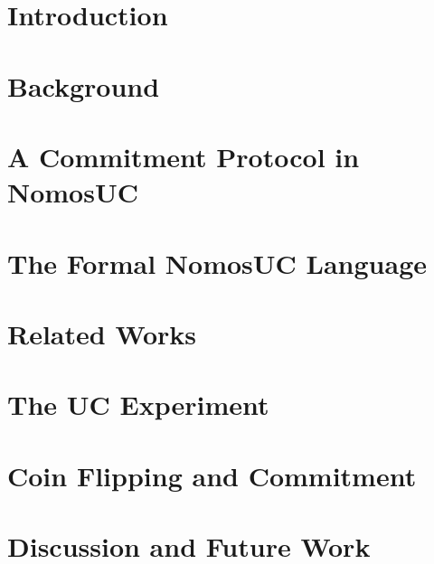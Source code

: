 \documentclass[acmsmall, screen, review, anonymous]{acmart}
\begin{document}
\maketitle



\section{Introduction}


\section{Background} \label{sec:background}


\section{A Commitment Protocol in NomosUC} \label{sec:example}


\section{The Formal NomosUC Language} \label{sec:nomosuc}


\section{Related Works}


%

\section{The UC Experiment} \label{sec:execuc}


\section{Coin Flipping and Commitment} \label{sec:commitment}


\section{Discussion and Future Work}

\end{document}
